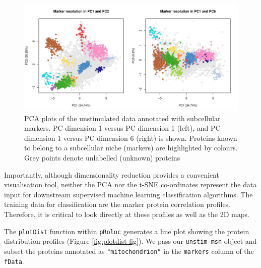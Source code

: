\documentclass[9pt,a4paper,]{extarticle}
\newenvironment{Shaded}{\begin{snugshade}}{\end{snugshade}}
\newcommand{\AttributeTok}[1]{\textcolor[rgb]{0.13,0.29,0.53}{#1}}
\newcommand{\DecValTok}[1]{\textcolor[rgb]{0.00,0.00,0.81}{#1}}
\newcommand{\DocumentationTok}[1]{\textcolor[rgb]{0.56,0.35,0.01}{\textbf{\textit{#1}}}}
\newcommand{\FunctionTok}[1]{\textcolor[rgb]{0.13,0.29,0.53}{\textbf{#1}}}
\newcommand{\NormalTok}[1]{#1}
\newcommand{\OtherTok}[1]{\textcolor[rgb]{0.56,0.35,0.01}{#1}}
\newcommand{\SpecialCharTok}[1]{\textcolor[rgb]{0.81,0.36,0.00}{\textbf{#1}}}
\newcommand{\StringTok}[1]{\textcolor[rgb]{0.31,0.60,0.02}{#1}}
\begin{document}
\begin{figure}[H]

{\centering \includegraphics[width=0.9\linewidth,]{figs/diff_pc_maps} 

}

\caption{PCA plots of the unstimulated data annotated with subcellular markers. PC dimension 1 versus PC dimension 1 (left), and PC dimension 1 versus PC dimension 6 (right) is shown. Proteins known to belong to a subcellular niche (markers) are highlighted by colours. Grey points denote unlabelled (unknown) proteins}\label{fig:diff-pcas-fig}
\end{figure}

Importantly, although dimensionality reduction provides a convenient visualisation
tool, neither the PCA nor the t-SNE co-ordinates represent the data input for
downstream supervised machine learning classification algorithms. The training
data for classification are the marker protein correlation profiles. Therefore,
it is critical to look directly at these profiles as well as the 2D maps.

The \texttt{plotDist} function within \texttt{pRoloc} generates a line plot showing the protein
distribution profiles (Figure \ref{fig:plotdist-fig}). We pass our \texttt{unstim\_msn}
object and subset the proteins annotated as \texttt{"mitochondrion"} in the \texttt{markers}
column of the \texttt{fData}.

\begin{Shaded}
\end{Shaded}
\end{document}
